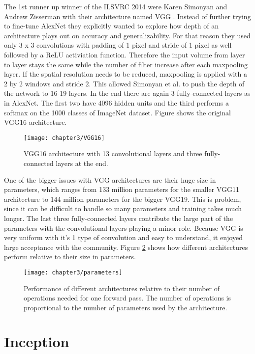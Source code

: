 The 1st runner up winner of the ILSVRC 2014 were Karen Simonyan and Andrew Zisserman with their architecture named VGG \cite{simonyan2014very}. Instead of further trying to fine-tune AlexNet they explicitly wanted to explore how depth of an architecture plays out on accuracy and generalizability. For that reason they used only 3 x 3 convolutions with padding of 1 pixel and stride of 1 pixel as well followed by a ReLU activiation function. Therefore the input volume from layer to layer stays the same while the number of filter increase after each maxpooling layer. If the spatial resolution needs to be reduced, maxpooling is applied with a 2 by 2 windows and stride 2. This allowed Simonyan et al. to push the depth of the network to 16-19 layers. In the end there are again 3 fully-connected layers as in AlexNet. The first two have 4096 hidden units and the third performs a softmax on the 1000 classes of ImageNet dataset. Figure shows the original VGG16 architecture.

\begin{figure}[H]
  \centering
  \caption{VGG16 architecture with 13 convolutional layers and three fully-connected layers at the end. \cite{ferguson2017automatic}}
  \texttt{[image: chapter3/VGG16]}
  \label{fig:vgg16}
\end{figure}

One of the bigger issues with VGG architectures are their huge size in parameters, which ranges from 133 million parameters for the smaller VGG11 architecture to 144 million parameters for the bigger VGG19. This is problem, since it can be difficult to handle so many parameters and training takes much longer. The last three fully-connected layers contribute the large part of the parameters with the convolutional layers playing a minor role. Because VGG is very uniform with it's 1 type of convolution and easy to understand, it enjoyed large acceptance with the community. Figure \ref{fig:parameters} shows how different architectures perform relative to their size in parameters.

\begin{figure}[H]
  \centering
  \caption{Performance of different architectures relative to their number of operations needed for one forward pass. The number of operations is proportional to the number of parameters used by the architecture. \cite{canziani2016analysis}}
  \texttt{[image: chapter3/parameters]}
  \label{fig:parameters}
\end{figure}

\section{Inception}

